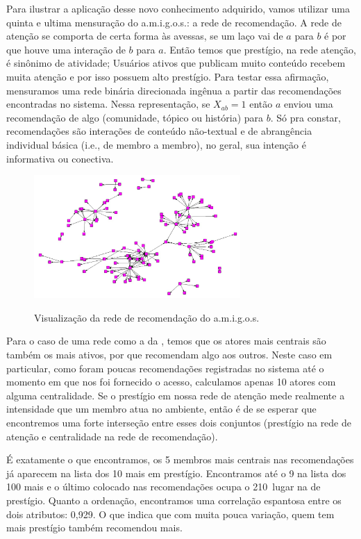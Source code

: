 Para ilustrar a aplicação desse novo conhecimento adquirido, vamos utilizar uma
quinta e ultima mensuração do a.m.i.g.o.s.: a rede de recomendação. A rede de
atenção se comporta de certa forma às avessas, se um laço vai de $a$ para $b$ é
por que houve uma interação de $b$ para $a$. Então temos que prestígio, na rede
atenção, é sinônimo de atividade; Usuários ativos que publicam muito conteúdo
recebem muita atenção e por isso possuem alto prestígio. Para testar essa
afirmação, mensuramos uma rede binária direcionada ingênua a partir das
recomendações encontradas no sistema. Nessa representação, se $X_{ab}=1$ então
$a$ enviou uma recomendação de algo (comunidade, tópico ou história) para $b$.
Só pra constar, recomendações são interações de conteúdo não-textual e de
abrangência individual básica (i.e., de membro a membro), no geral, sua
intenção é informativa ou conectiva.

\begin{figure}[h!]
  \caption{Visualização da rede de recomendação do a.m.i.g.o.s.}
  \centering
    \includegraphics[width=0.7\textwidth]{imgs/recmd.jpg}
    \label{ap:fig:recmd}
\end{figure}

Para o caso de uma rede como a da , temos que os atores
mais centrais são também os mais ativos, por que recomendam algo aos outros.
Neste caso em particular, como foram poucas recomendações registradas no sistema
até o momento em que nos foi fornecido o acesso, calculamos apenas 10 atores com
alguma centralidade. Se o prestígio em nossa rede de atenção mede realmente a
intensidade que um membro atua no ambiente, então é de se esperar que
encontremos uma forte interseção entre esses dois conjuntos (prestígio na rede
de atenção e centralidade na rede de recomendação).

É exatamente o que encontramos, os 5 membros mais centrais nas recomendações já
aparecem na lista dos 10 mais em prestígio. Encontramos até o 9 na  lista dos 100
mais e o último colocado nas recomendações ocupa o 210\textordmasculine~lugar
na de prestígio. Quanto a ordenação, encontramos uma correlação espantosa entre os
dois atributos: 0,929. O que indica que com muita pouca variação, quem tem mais
prestígio também recomendou mais.


